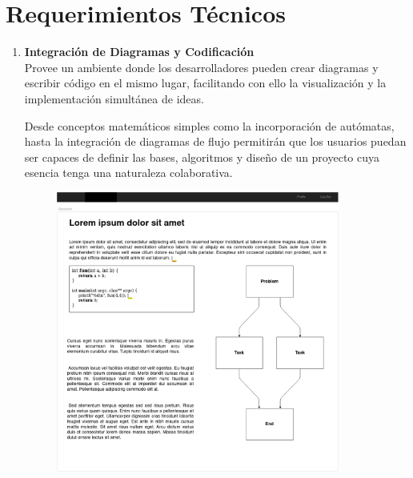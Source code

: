 \documentclass[a4paper, oneside, final]{scrartcl}
\begin{document}
\clearpage
\section{Requerimientos Técnicos}

\begin{enumerate}
\item \textbf{Integración de Diagramas y Codificación}\\ %
  Provee un ambiente donde los desarrolladores pueden crear diagramas y escribir
  código en el mismo lugar, facilitando con ello la visualización y la
  implementación simultánea de ideas.

  Desde conceptos matemáticos simples como la incorporación de autómatas, hasta
  la integración de diagramas de flujo permitirán que los usuarios puedan ser
  capaces de definir las bases, algoritmos y diseño de un proyecto cuya esencia
  tenga una naturaleza colaborativa.

  \begin{figure}[h!]
    \centering
    \includegraphics[width=0.88\textwidth]{Interface01.png}
  \end{figure}


\end{enumerate}
\end{document}

